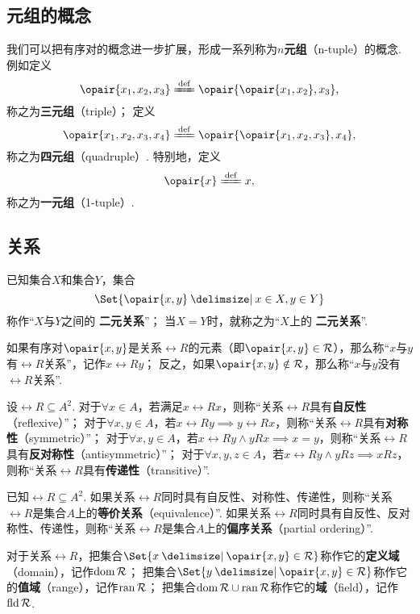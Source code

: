 \subsection{元组的概念}
我们可以把有序对的概念进一步扩展，形成一系列称为\(n\)\textbf{元组}（n-tuple）的概念.
例如定义\[
\opair{x_1,x_2,x_3}
\defeq
\opair{\opair{x_1,x_2},x_3},
\]称之为\textbf{三元组}（triple）；
定义\[
\opair{x_1,x_2,x_3,x_4}
\defeq
\opair{\opair{x_1,x_2,x_3},x_4},
\]称之为\textbf{四元组}（quadruple）.
特别地，定义\[
\opair{x}
\defeq
x,
\]称之为\textbf{一元组}（1-tuple）.

\subsection{关系}
\begin{definition}
已知集合\(X\)和集合\(Y\)，集合\[
\Set{ \opair{x,y} \given x \in X, y \in Y }
\]称作“\(X\)与\(Y\)之间的\textbf{ 二元关系}”；
当\(X = Y\)时，就称之为“\(X\)上的\textbf{ 二元关系}”.

如果有序对\(\opair{x,y}\)是关系\(\rel{R}\)的元素（即\(\opair{x,y} \in \rel{R}\)），那么称“\(x\)与\(y\)有\(\rel{R}\)关系”，记作\(x\rel{R}y\)；
反之，如果\(\opair{x,y} \notin \rel{R}\)，那么称“\(x\)与\(y\)没有\(\rel{R}\)关系”.
\end{definition}

\begin{definition}
设\(\rel{R} \subseteq A^2\).
对于\(\forall x \in A\)，若满足\(x\rel{R}x\)，则称“关系\(\rel{R}\)具有\textbf{自反性}（reflexive）”；
对于\(\forall x,y \in A\)，若\(x\rel{R}y \implies y\rel{R}x\)，则称“关系\(\rel{R}\)具有\textbf{对称性}（symmetric）”；
对于\(\forall x,y \in A\)，若\(x\rel{R}y \land yRx \implies x = y\)，则称“关系\(\rel{R}\)具有\textbf{反对称性}（antisymmetric）”；
对于\(\forall x,y,z \in A\)，若\(x\rel{R}y \land yRz \implies xRz\)，则称“关系\(\rel{R}\)具有\textbf{传递性}（transitive）”.
\end{definition}

\begin{definition}
已知\(\rel{R} \subseteq A^2\).
如果关系\(\rel{R}\)同时具有自反性、对称性、传递性，则称“关系\(\rel{R}\)是集合\(A\)上的\textbf{等价关系}（equivalence）”.
如果关系\(\rel{R}\)同时具有自反性、反对称性、传递性，则称“关系\(\rel{R}\)是集合\(A\)上的\textbf{偏序关系}（partial ordering）”.
\end{definition}

\begin{definition}
对于关系\(\rel{R}\)，把集合\(
\Set{ x \given \opair{x,y} \in \rel{R} }
\)称作它的\textbf{定义域}（domain），记作\(\operatorname{dom} \mathcal{R}\)；
把集合\(
\Set{ y \given \opair{x,y} \in \rel{R} }
\)称作它的\textbf{值域}（range），记作\(\operatorname{ran} \mathcal{R}\)；
把集合\(
\operatorname{dom} \mathcal{R} \cup \operatorname{ran} \mathcal{R}
\)称作它的\textbf{域}（field），记作\(\operatorname{fld} \mathcal{R}\).
\end{definition}

